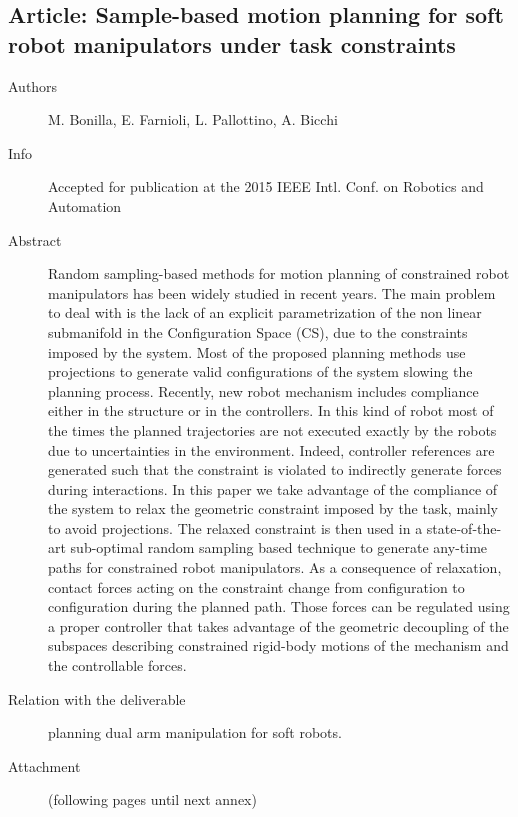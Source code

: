 \documentclass[a4paper,11pt,pdf]{pacmanreport}
\begin{document}
\subsection{Article: Sample-based motion planning for soft robot manipulators under task constraints} \label{ann:softPlanning}
\begin{description}
    \item[Authors] M. Bonilla, E. Farnioli, L. Pallottino, A. Bicchi
    \item[Info] Accepted for publication at the 2015 IEEE Intl. Conf. on Robotics and Automation
    \item[Abstract] Random sampling-based methods for motion planning of constrained robot manipulators has been widely studied in recent years. The main problem to deal with is the lack of an explicit parametrization of the non linear submanifold in the Configuration Space (CS), due to the constraints imposed by the system. Most of the proposed planning methods use projections to generate valid configurations of the system slowing the planning process. Recently, new robot mechanism includes compliance either in the structure or in the controllers. In this kind of robot most of the times the planned trajectories are not executed exactly by the robots due to uncertainties in the environment. Indeed, controller references are generated such that the constraint is violated to indirectly generate forces during interactions. In this paper we take advantage of the compliance of the system to relax the geometric constraint imposed by the task, mainly to avoid projections. The relaxed constraint is then used in a state-of-the-art sub-optimal random sampling based technique to generate any-time paths for constrained robot manipulators. As a consequence of relaxation, contact forces acting on the constraint change from configuration to configuration during the planned path. Those forces can be regulated using a proper controller that takes advantage of the geometric decoupling of the subspaces describing constrained
    rigid-body motions of the mechanism and the controllable forces.
    \item[Relation with the deliverable] planning dual arm manipulation for soft robots.
    \item[Attachment] (following pages until next annex)
\end{description}

\end{document}
